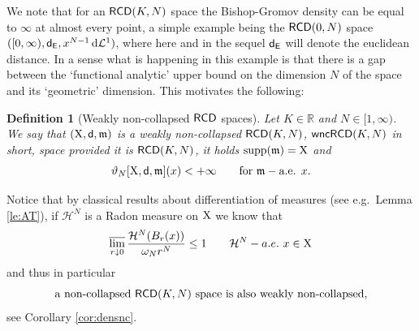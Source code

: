 \documentclass[reqno,11pt]{article}
\numberwithin{equation}{section}
\newcommand{\R}{\mathbb{R}}
\newcommand{\mm}{{\mbox{\boldmath$m$}}}
\newcommand{\sfd}{{\sf d}}
\newcommand{\supp}{\mathop{\rm supp}\nolimits}   %
\renewcommand{\d}{{\mathrm d}}
\newcommand{\lims}{\varlimsup}
\renewcommand{\mm}{\mathfrak m}                                %
\newtheorem{definition}[theorem]{Definition}
\newcommand{\X}{{\rm X}}
\newcommand{\RCD}{{\sf RCD}}
\newcommand{\wncRCD}{{\sf wncRCD}}
\newcommand{\Eu}{{\sf E}}
\newcommand{\HH}{{\mathcal H}}
\newcommand{\LL}{{\mathcal L}}
\begin{document}
We note that for an \(\RCD(K,N)\) space the Bishop-Gromov density can be equal to \(\infty\) at almost every  point,  a simple example being  the \(\RCD(0,N)\) space \(([0,\infty), \sfd_{\Eu}, x^{N-1}\,\d \LL^1)\), where here and in the sequel  \(\sfd_{\Eu}\) will denote the euclidean distance. In a sense what is happening in this example is that there is a gap between the `functional analytic' upper bound on the dimension \(N\) of the space and  its `geometric' dimension.  This motivates the following:
\begin{definition}[Weakly non-collapsed $\RCD$ spaces]\label{def:wnc} Let $K\in\R$ and {$N\in [1,\infty)$}. We say that  $(\X,\sfd,\mm)$ is a \emph{weakly non-collapsed $\RCD(K,N)$}, $\wncRCD(K,N)$ in short, space  provided it is $\RCD(K,N)$, it holds $\supp(\mm)=\X$ and
\[
\vartheta_{N}[\X,\sfd,\mm](x)<+\infty\qquad\text{for } \mm-\text{a.e. \(x\)}.
\]
\end{definition}
Notice that by classical results about differentiation of measures (see e.g.\ Lemma \ref{le:AT}), if $\HH^N$ is a Radon measure on $\X$ we know that
\[
\lims_{r\downarrow0}\frac{\HH^N(B_r(x))}{\omega_Nr^N}\leq1\qquad\HH^N-a.e.\ x\in\X
\]
and thus in particular
\[
\text{a non-collapsed $\RCD(K,N)$ space is also weakly non-collapsed},
\]
see Corollary \ref{cor:densnc}. 
\end{document}
